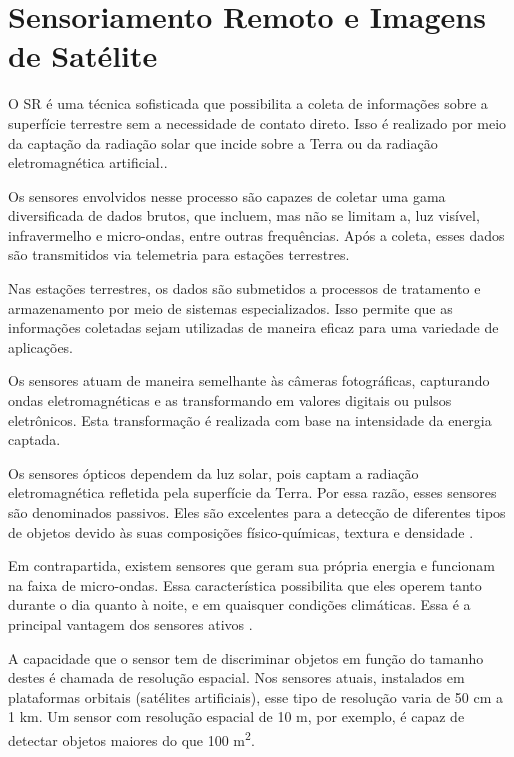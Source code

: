 \documentclass[
    12pt,                   %
    openright,              %
    oneside,                %
    a4paper,                %
    sumario=tradicional,    %
    english,                %
    brazil,                 %
    ]{abntex2}
\begin{document}
\section{Sensoriamento Remoto e Imagens de Satélite}
    O SR é uma técnica sofisticada que possibilita a coleta de informações sobre a superfície terrestre sem a necessidade de contato direto. Isso é realizado por meio da captação da radiação solar que incide sobre a Terra ou da radiação eletromagnética artificial.\cite{figueiredo2005conceitos}.

    Os sensores envolvidos nesse processo são capazes de coletar uma gama diversificada de dados brutos, que incluem, mas não se limitam a, luz visível, infravermelho e micro-ondas, entre outras frequências. Após a coleta, esses dados são transmitidos via telemetria para estações terrestres.

    Nas estações terrestres, os dados são submetidos a processos de tratamento e armazenamento por meio de sistemas especializados. Isso permite que as informações coletadas sejam utilizadas de maneira eficaz para uma variedade de aplicações.

    Os sensores atuam de maneira semelhante às câmeras fotográficas, capturando ondas eletromagnéticas e as transformando em valores digitais ou pulsos eletrônicos. Esta transformação é realizada com base na intensidade da energia captada.

    Os sensores ópticos dependem da luz solar, pois captam a radiação eletromagnética refletida pela superfície da Terra. Por essa razão, esses sensores são denominados passivos. Eles são excelentes para a detecção de diferentes tipos de objetos devido às suas composições físico-químicas, textura e densidade \cite{figueiredo2005conceitos}.

    Em contrapartida, existem sensores que geram sua própria energia e funcionam na faixa de micro-ondas. Essa característica possibilita que eles operem tanto durante o dia quanto à noite, e em quaisquer condições climáticas. Essa é a principal vantagem dos sensores ativos \cite{florenzano2007iniciaccao}.


    A capacidade que o sensor tem de discriminar objetos em função do tamanho destes é chamada de resolução espacial. Nos sensores atuais, instalados em plataformas orbitais (satélites artificiais), esse tipo de resolução varia de 50 cm a 1 km. Um sensor com resolução espacial de 10 m, por exemplo, é capaz de detectar objetos maiores do que 100 m\textsuperscript{2}.
\end{document}
